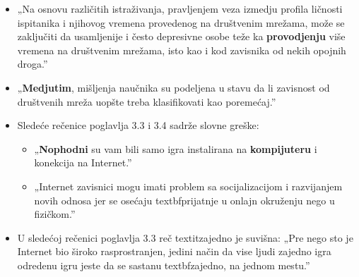 \documentclass[a4paper]{report}
\newcommand{\odgovor}[1]{\textcolor{blue}{#1}}
\begin{document}
\begin{itemize}
\begin{itemize}
        \odgovor{}
        
    \end{itemize}
    \begin{itemize}
        \item  „Na osnovu različitih istraživanja, pravljenjem veza izmedju profila ličnosti ispitanika i njihovog vremena provedenog na društvenim mrežama, može se zaključiti da usamljenije i često depresivne osobe teže ka \textbf{provodjenju} više vremena na društvenim mrežama, isto kao i kod zavisnika od nekih opojnih droga.”
        
        \odgovor{}
        
        
    \end{itemize}
    \begin{itemize}
        \item  „\textbf{Medjutim}, mišljenja naučnika su podeljena u stavu da li zavisnost od društvenih mreža uopšte treba klasifikovati kao poremećaj.”
        
        \odgovor{}
        
    \end{itemize}
\end{itemize}
\begin{itemize}
    \item Sledeće rečenice poglavlja 3.3 i 3.4 sadrže slovne greške:\newline
    \begin{itemize}
        \item „\textbf{Nophodni} su vam bili samo igra instalirana na \textbf{kompijuteru} i konekcija na Internet.”
        
        \odgovor{}
        
        
    \end{itemize}
    \begin{itemize}
        \item  „Internet zavisnici mogu imati problem sa socijalizacijom i razvijanjem novih odnosa jer se osećaju textbf{prijatnje} u onlajn okruženju nego u fizičkom.”
        
        \odgovor{}
        
    \end{itemize}
\end{itemize}
\begin{itemize}
    \item U sledećoj rečenici poglavlja 3.3 reč textit{zajedno} je suvišna: \newline
    „Pre nego sto je Internet bio široko rasprostranjen, jedini način da vise ljudi zajedno igra odredenu igru jeste da se sastanu textbf{zajedno}, na jednom mestu.”
    
    \odgovor{}
    
    
\end{itemize}
\end{document}
